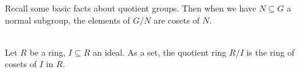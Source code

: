 \documentclass[12pt]{article}
\newenvironment{definition}[2][Definition]{\begin{trivlist}
    \item[\hskip \labelsep {\bfseries #1}\hskip \labelsep {\bfseries #2.}]}{\end{trivlist}}
\begin{document}
Recall some basic facts about quotient groups. Then when we have $N \subseteq G$ a normal subgroup, the elements of $G/N$ are cosets of $N$. \\ \\
\begin{definition}{(Quotient Ring)}
    Let $R$ be a ring, $I \subseteq R$ an ideal. As a set, the quotient ring $R/I$ is the ring of cosets of $I$ in $R$.
\end{definition}
\end{document}
